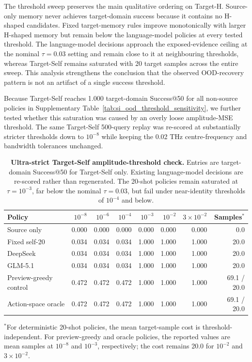 \documentclass[final,1p,times]{elsarticle}
\begin{document}
The threshold sweep preserves the main qualitative ordering on Target-H. Source-only memory never achieves target-domain success because it contains no H-shaped candidates. Fixed target-memory rules improve monotonically with larger H-shaped memory but remain below the language-model policies at every tested threshold. The language-model decisions approach the exposed-evidence ceiling at the nominal $\tau=0.03$ setting and remain close to it at neighbouring thresholds, whereas Target-Self remains saturated with 20 target samples across the entire sweep. This analysis strengthens the conclusion that the observed OOD-recovery pattern is not an artifact of a single success threshold.

Because Target-Self reaches 1.000 target-domain Success@50 for all non-source policies in Supplementary Table~\ref{tab:si_ood_threshold_sensitivity}, we further tested whether this saturation was caused by an overly loose amplitude-MSE threshold. The same Target-Self 500-query replay was re-scored at substantially stricter thresholds down to $10^{-8}$ while keeping the 0.02 THz centre-frequency and bandwidth tolerances unchanged.

\begin{table}[htbp!]
\caption{\textbf{Ultra-strict Target-Self amplitude-threshold check.}
Entries are target-domain Success@50 for Target-Self only. Existing language-model decisions are re-scored rather than regenerated. The 20-shot policies remain saturated at $\tau=10^{-3}$, far below the nominal $\tau=0.03$, but fail under near-identity thresholds of $10^{-4}$ and below.}
\label{tab:si_target_self_strict_threshold}
\centering
\small
\setlength{\tabcolsep}{3.5pt}
\renewcommand{\arraystretch}{1.12}
\begin{tabular}{lrrrrrrr}
\toprule
Policy & $10^{-8}$ & $10^{-6}$ & $10^{-4}$ & $10^{-3}$ & $10^{-2}$ & $3{\times}10^{-2}$ & Samples$^\ast$ \\
\midrule
Source only & 0.000 & 0.000 & 0.000 & 0.000 & 0.000 & 0.000 & 0.0 \\
Fixed self-20 & 0.034 & 0.034 & 0.034 & 1.000 & 1.000 & 1.000 & 20.0 \\
DeepSeek & 0.034 & 0.034 & 0.034 & 1.000 & 1.000 & 1.000 & 20.0 \\
GLM-5.1 & 0.034 & 0.034 & 0.034 & 1.000 & 1.000 & 1.000 & 20.0 \\
Preview-greedy control & 0.472 & 0.472 & 0.472 & 1.000 & 1.000 & 1.000 & 69.1 / 20.0 \\
Action-space oracle & 0.472 & 0.472 & 0.472 & 1.000 & 1.000 & 1.000 & 69.1 / 20.0 \\
\bottomrule
\end{tabular}
\vspace{2pt}
\raggedright\footnotesize $^\ast$For deterministic 20-shot policies, the mean target-sample cost is threshold-independent. For preview-greedy and oracle policies, the reported values are mean samples at $10^{-8}$ and $10^{-3}$, respectively; the cost remains 20.0 for $10^{-2}$ and $3{\times}10^{-2}$.
\end{table}
\end{document}
